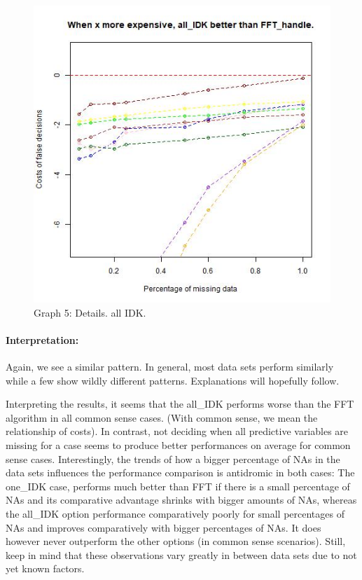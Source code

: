 \documentclass[
]{article}
\begin{document}
\begin{figure}
\centering
\includegraphics{graphs/acc_all_IDK_better_see.jpg}
\caption{Graph 5: Details. all IDK.}
\end{figure}

\hypertarget{interpretation-1}{%
\paragraph{Interpretation:}\label{interpretation-1}}

Again, we see a similar pattern. In general, most data sets perform
similarly while a few show wildly different patterns. Explanations will
hopefully follow.

Interpreting the results, it seems that the all\_IDK performs worse than
the FFT algorithm in all common sense cases. (With common sense, we mean
the relationship of costs). In contrast, not deciding when all
predictive variables are missing for a case seems to produce better
performances on average for common sense cases. Interestingly, the
trends of how a bigger percentage of NAs in the data sets influences the
performance comparison is antidromic in both cases: The one\_IDK case,
performs much better than FFT if there is a small percentage of NAs and
its comparative advantage shrinks with bigger amounts of NAs, whereas
the all\_IDK option performance comparatively poorly for small
percentages of NAs and improves comparatively with bigger percentages of
NAs. It does however never outperform the other options (in common sense
scenarios). Still, keep in mind that these observations vary greatly in
between data sets due to not yet known factors.
\end{document}
